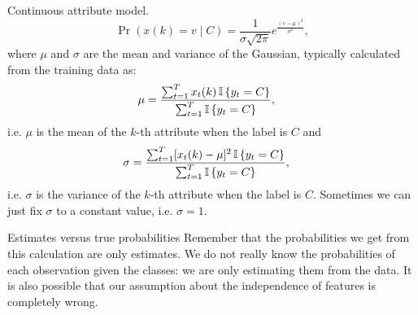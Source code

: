 \begin{frame}
  \begin{block}{Continuous attribute model.}
    \[
      \Pr(x(k) = v \mid C) = \frac{1}{\sigma \sqrt{2 \pi}} e^{\frac{(v -
          \mu)^2}{\sigma^2}},
    \]
    where $\mu$ and $\sigma$ are the mean and variance of the
    Gaussian, typically calculated from the training data as:
    \begin{align*}
      \mu &=   \frac{\sum_{t=1}^T x_t(k) \mathop{\mbox{\ensuremath{\mathbb{I}}}}\left\{y_t = C\right\}}
            {\sum_{t=1}^T \mathop{\mbox{\ensuremath{\mathbb{I}}}}\left\{y_t = C\right\}},
    \end{align*}
    i.e. $\mu$ is the mean of the $k$-th attribute when the label is
    $C$ and
    \begin{align*}
      \sigma &=   \frac{\sum_{t=1}^T [x_t(k) - \mu]^2 \mathop{\mbox{\ensuremath{\mathbb{I}}}}\left\{y_t = C\right\}}
               {\sum_{t=1}^T \mathop{\mbox{\ensuremath{\mathbb{I}}}}\left\{y_t = C\right\}},
    \end{align*}
    i.e. $\sigma$ is the variance of the $k$-th attribute when the
    label is $C$.  Sometimes we can just fix $\sigma$ to a constant
    value, i.e. $\sigma = 1$.
  \end{block}
\end{frame}

\begin{frame}
  \begin{alertblock}{Estimates versus true probabilities}
    Remember that the probabilities we get from this calculation are
    only \alert{estimates}. We do not really know the probabilities of
    each observation given the classes: we are only estimating them
    from the data. It is also possible that our assumption about the
    independence of features is completely wrong.
  \end{alertblock}
\end{frame}
